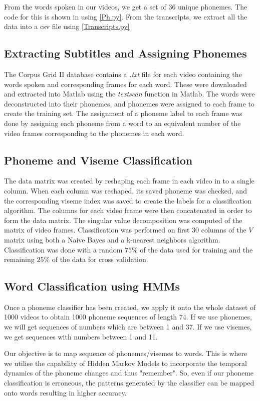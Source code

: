 \documentclass[a4paper,11pt]{article}
\begin{document}
From the words spoken in our videos, we get a set of 36 unique phonemes. The code for this is shown in using \ref{Ph.py}. From the transcripts, we extract all the data into a csv file using \ref{Transcripts.py}



\subsection{Extracting Subtitles and Assigning Phonemes}
The Corpus Grid II database contains a {\it .txt} file for each video containing the words spoken and corresponding frames for each word.  These were downloaded and extracted into Matlab using the {\it textscan} function in Matlab.  The words were deconstructed into their phonemes, and phonemes were assigned to each frame to create the training set.  The assignment of a phoneme label to each frame was done by assigning each phoneme from a word to an equivalent number of the video frames corresponding to the phonemes in each word. 

\subsection{Phoneme and Viseme Classification}
The data matrix was created by reshaping each frame in each video in to a single column.  When each column was reshaped, its saved phoneme was checked, and the corresponding viseme index was saved to create the labels for a classification algorithm. The columns for each video frame were then concatenated in order to form the data matrix.  The singular value decomposition was computed of the matrix of video frames.  Classification was performed on first 30 columns of the $V$ matrix using both a Naive Bayes and a k-nearest neighbors algorithm.  Classification was done with a random $75\%$ of the data used for training and the remaining $25\%$ of the data for cross validation.

\subsection{Word Classification using HMMs}

Once a phoneme classifier has been created, we apply it onto the whole dataset of 1000 videos to obtain 1000 phoneme sequences of length 74. If we use phonemes, we will get sequences of numbers which are between 1 and 37. If we use visemes, we get sequences with numbers between 1 and 11.

Our objective is to map sequence of phonemes/visemes to words. This is where we utilise the capability of Hidden Markov Models to incorporate the temporal dynamics of the phoneme changes and thus "remember". So, even if our phoneme classification is erroneous, the patterns generated by the classifier can be mapped onto words resulting in higher accuracy.
\end{document}
